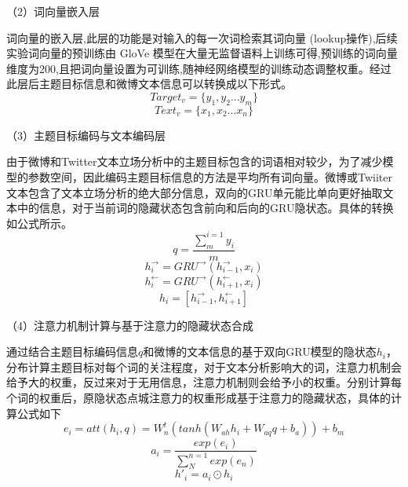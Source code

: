 （2）词向量嵌入层

词向量的嵌入层,此层的功能是对输入的每一次词检索其词向量 (lookup操作),后续实验词向量的预训练由 GloVe 模型在大量无监督语料上训练可得,预训练的词向量维度为200,且把词向量设置为可训练,随神经网络模型的训练动态调整权重。经过此层后主题目标信息和微博文本信息可以转换成以下形式。
\begin{equation}\label{target_info} Target_v= \lbrace y_1,y_2...y_m\rbrace \end{equation}
\begin{equation}\label{text_info} Text_v=\lbrace x_1,x_2...x_n\rbrace \end{equation}

（3）主题目标编码与文本编码层

由于微博和Twitter文本立场分析中的主题目标包含的词语相对较少，为了减少模型的参数空间，因此编码主题目标信息的方法是平均所有词向量。微博或Twiiter文本包含了文本立场分析的绝大部分信息，双向的GRU单元能比单向更好抽取文本中的信息，对于当前词的隐藏状态包含前向和后向的GRU隐状态。具体的转换如公式所示。
\begin{equation}\label{target_info} q=\frac{\sum_{m}^{i=1}y_i}{m} \end{equation}
\begin{equation}\label{target_info} h^→_i = GRU^→(h^→_{i-1}, x_i) \end{equation}
\begin{equation}\label{text_info}  h^←_i = GRU^→(h^←_{i+1}, x_i) \end{equation}
\begin{equation}\label{text_info}  h_i = [h^→_{i-1}, h^←_{i+1}] \end{equation}

（4）注意力机制计算与基于注意力的隐藏状态合成

通过结合主题目标编码信息$q$和微博的文本信息的基于双向GRU模型的隐状态$h_i$，分布计算主题目标对每个词的关注程度，对于文本分析影响大的词，注意力机制会给予大的权重，反过来对于无用信息，注意力机制则会给予小的权重。分别计算每个词的权重后，原隐状态点城注意力的权重形成基于注意力的隐藏状态，具体的计算公式如下
\begin{equation}\label{conv1} e_i=att(h_i,q)=W^t_n(tanh(W_{ah}h_i+W_{aq}q+b_a))+b_m \end{equation}
\begin{equation}\label{conv1} a_i=\frac{exp(e_i)}{\sum_{N}^{n=1}exp(e_n)} \end{equation}
\begin{equation}\label{conv1} h'_i=a_i \odot h_i \end{equation}

